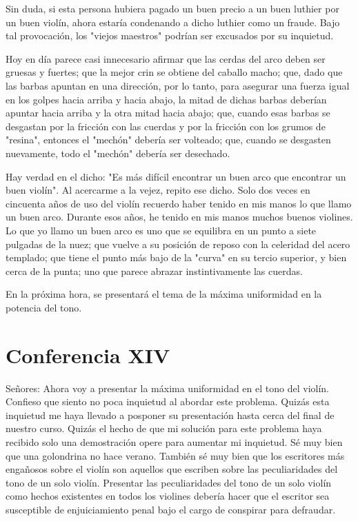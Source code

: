 \documentclass[12pt]{book}
\begin{document}
Sin duda, si esta persona hubiera pagado un buen precio a un buen luthier por un buen violín, ahora estaría condenando a dicho luthier como un fraude. Bajo tal provocación, los "viejos maestros" podrían ser excusados por su inquietud.

Hoy en día parece casi innecesario afirmar que las cerdas del arco deben ser gruesas y fuertes; que la mejor crin se obtiene del caballo macho; que, dado que las barbas apuntan en una dirección, por lo tanto, para asegurar una fuerza igual en los golpes hacia arriba y hacia abajo, la mitad de dichas barbas deberían apuntar hacia arriba y la otra mitad hacia abajo; que, cuando esas barbas se desgastan por la fricción con las cuerdas y por la fricción con los grumos de "resina", entonces el "mechón" debería ser volteado; que, cuando se desgasten nuevamente, todo el "mechón" debería ser desechado.

Hay verdad en el dicho: "Es más difícil encontrar un buen arco que encontrar un buen violín". Al acercarme a la vejez, repito ese dicho. Solo dos veces en cincuenta años de uso del violín recuerdo haber tenido en mis manos lo que llamo un buen arco. Durante esos años, he tenido en mis manos muchos buenos violines. Lo que yo llamo un buen arco es uno que se equilibra en un punto a siete pulgadas de la nuez; que vuelve a su posición de reposo con la celeridad del acero templado; que tiene el punto más bajo de la "curva" en su tercio superior, y bien cerca de la punta; uno que parece abrazar instintivamente las cuerdas.

En la próxima hora, se presentará el tema de la máxima uniformidad en la potencia del tono.

\section*{Conferencia XIV}
Señores: Ahora voy a presentar la máxima uniformidad en el tono del violín. Confieso que siento no poca inquietud al abordar este problema. Quizás esta inquietud me haya llevado a posponer su presentación hasta cerca del final de nuestro curso. Quizás el hecho de que mi solución para este problema haya recibido solo una demostración opere para aumentar mi inquietud. Sé muy bien que una golondrina no hace verano. También sé muy bien que los escritores más engañosos sobre el violín son aquellos que escriben sobre las peculiaridades del tono de un solo violín. Presentar las peculiaridades del tono de un solo violín como hechos existentes en todos los violines debería hacer que el escritor sea susceptible de enjuiciamiento penal bajo el cargo de conspirar para defraudar.
\end{document}
